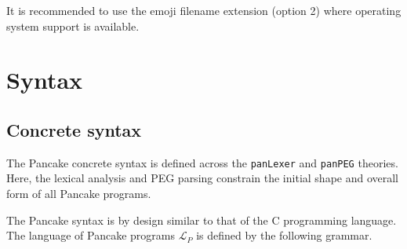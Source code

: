 \documentclass[12pt,a4paper]{report}
\begin{document}
It is recommended to use the emoji filename extension (option 2) where operating system support is available.

\chapter{Syntax}
\label{cha:syntax}

\section{Concrete syntax}
\label{sec:concrete-syntax}

The Pancake concrete syntax is defined across the \texttt{panLexer} and \texttt{panPEG} theories. Here, the lexical analysis and PEG parsing constrain the initial shape and overall form of all Pancake programs.

The Pancake syntax is by design similar to that of the C programming language. The language of Pancake programs $\mathcal{L}_{P}$ is defined by the following grammar.
\end{document}
